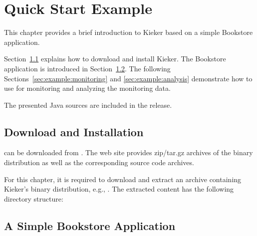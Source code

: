 \chapter{Quick Start Example}

This chapter provides a brief introduction to Kieker based on %
a simple Bookstore application. %

Section~\ref{sec:example:downloadInstall} explains how to download and install %
Kieker. %
The Bookstore application is introduced in Section~\ref{sec:example:bookstore}. %
The following Sections~\ref{sec:example:monitoring} %
and \ref{sec:example:analysis} demonstrate how to use \Kieker{} for monitoring %
and analyzing the monitoring data. %

\notify The presented Java sources are included in the \Kieker{} release.

\section{Download and Installation}\label{sec:example:downloadInstall}

\Kieker{} can be downloaded from \KiekerURL. The web %
site provides zip/tar.gz archives of the \Kieker{} binary distribution as well %
as the corresponding \Kieker{} source code archives.

For this chapter, it is required to download and extract an archive containing %
Kieker's binary distribution, e.g., \file{\binaryFileForDownload}.
The extracted content has the following directory structure:

\vspace{1ex}


\section{A Simple Bookstore Application}\label{sec:example:bookstore}

